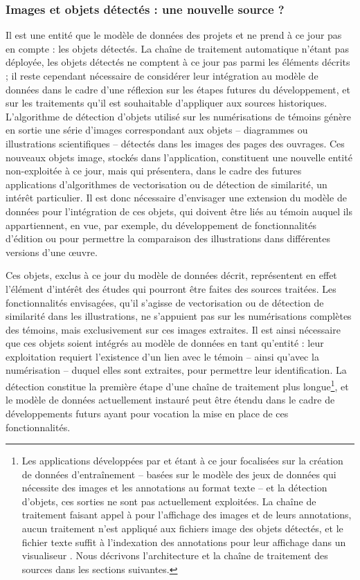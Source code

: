 	\subsubsection{Images et objets détectés : une nouvelle source ?}
	
	Il est une entité que le modèle de données des projets \vhs et \eida ne prend à ce jour pas en compte : les objets détectés. La chaîne de traitement automatique n'étant pas déployée, les objets détectés ne comptent à ce jour pas parmi les éléments décrits ; il reste cependant nécessaire de considérer leur intégration au modèle de données dans le cadre d'une réflexion sur les étapes futures du développement, et sur les traitements qu'il est souhaitable d'appliquer aux sources historiques. L'algorithme de détection d'objets utilisé sur les numérisations de témoins génère en sortie une série d'images correspondant aux objets -- diagrammes ou illustrations scientifiques -- détectés dans les images des pages des ouvrages. Ces nouveaux objets image, stockés dans l'application, constituent une nouvelle entité non-exploitée à ce jour, mais qui présentera, dans le cadre des futures applications d'algorithmes de vectorisation ou de détection de similarité, un intérêt particulier. Il est donc nécessaire d'envisager une extension du modèle de données pour l'intégration de ces objets, qui doivent être liés au témoin auquel ils appartiennent, en vue, par exemple, du développement de fonctionnalités d'édition ou pour permettre la comparaison des illustrations dans différentes versions d'une œuvre.
	
	Ces objets, exclus à ce jour du modèle de données décrit, représentent en effet l'élément d'intérêt des études qui pourront être faites des sources traitées. Les fonctionnalités envisagées, qu'il s'agisse de vectorisation ou de détection de similarité dans les illustrations, ne s'appuient pas sur les numérisations complètes des témoins, mais exclusivement sur ces images extraites. Il est ainsi nécessaire que ces objets soient intégrés au modèle de données en tant qu'entité : leur exploitation requiert l'existence d'un lien avec le témoin -- ainsi qu'avec la numérisation -- duquel elles sont extraites, pour permettre leur identification. La détection constitue la première étape d'une chaîne de traitement plus longue\footnote{Les applications développées par \eida et \vhs étant à ce jour focalisées sur la création de données d'entraînement -- basées sur le modèle des jeux de données \yolov qui nécessite des images et les annotations au format texte -- et la détection d'objets, ces sorties ne sont pas actuellement exploitées. La chaîne de traitement faisant appel à \iiif pour l'affichage des images et de leurs annotations, aucun traitement n'est appliqué aux fichiers image des objets détectés, et le fichier texte suffit à l'indexation des annotations pour leur affichage dans un visualiseur \iiif. Nous décrivons l'architecture et la chaîne de traitement des sources dans les sections suivantes.}, et le modèle de données actuellement instauré peut être étendu dans le cadre de développements futurs ayant pour vocation la mise en place de ces fonctionnalités.
